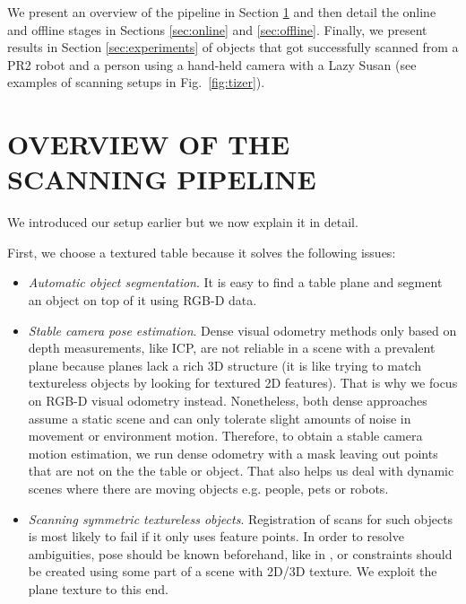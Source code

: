 \documentclass[letterpaper, 10 pt, conference]{ieeeconf}  %
\begin{document}
We present an overview of the pipeline in Section \ref{sec:overview} and then detail the online and offline stages in 
Sections \ref{sec:online} and \ref{sec:offline}. Finally, we present results in Section \ref{sec:experiments} of
objects that got successfully scanned from a PR2 robot and a person using a hand-held camera with a Lazy Susan (see 
examples of scanning setups in Fig.~\ref{fig:tizer}).


\section{OVERVIEW OF THE SCANNING PIPELINE}

\label{sec:overview}

We introduced our setup earlier but we now explain it in detail.

First, we choose a textured table because it solves the following issues:

\begin{itemize}

\item \textit{Automatic object segmentation}. It is easy to find a table plane and segment an object on top of 
it using RGB-D data.
\item \textit{Stable camera pose estimation}. Dense visual odometry methods only based on depth measurements,
like ICP, are not reliable in a scene with a prevalent plane \cite{rusinkiewicz2002real}
because planes lack a rich 3D structure (it is like trying to match textureless objects by looking for textured 2D 
features). That is why we focus on RGB-D visual odometry instead. Nonetheless, both dense approaches
assume a static scene and can only tolerate slight amounts of noise in movement or environment motion. Therefore,
to obtain a stable camera motion estimation, we run dense odometry with a mask leaving out points that are not on 
the the table or object. That also helps us deal with dynamic scenes where there are moving objects e.g. people, pets or 
robots.
\item \textit{Scanning symmetric textureless objects}. Registration of scans for such objects
is most likely to fail if it only uses feature points. In order to resolve ambiguities, pose should be known 
beforehand, like in \cite{krainin2011manipulator},
or constraints should be created using some part of a scene with
2D/3D texture. We exploit the plane texture to this end.
\end{itemize}

\end{document}
